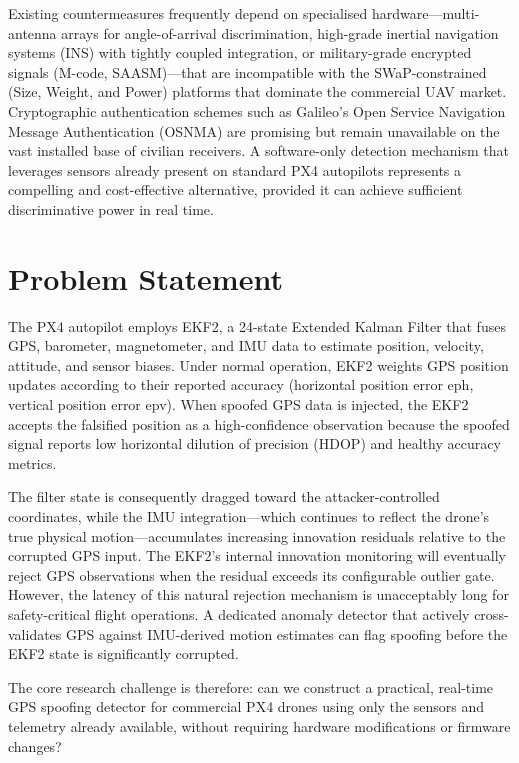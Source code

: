 Existing countermeasures frequently depend on specialised hardware---multi-antenna arrays for angle-of-arrival discrimination, high-grade inertial navigation systems (INS) with tightly coupled integration, or military-grade encrypted signals (M-code, SAASM)---that are incompatible with the SWaP-constrained (Size, Weight, and Power) platforms that dominate the commercial UAV market. Cryptographic authentication schemes such as Galileo's Open Service Navigation Message Authentication (OSNMA) are promising but remain unavailable on the vast installed base of civilian receivers. A software-only detection mechanism that leverages sensors already present on standard PX4 autopilots represents a compelling and cost-effective alternative, provided it can achieve sufficient discriminative power in real time.

\section{Problem Statement}

The PX4 autopilot employs EKF2, a 24-state Extended Kalman Filter that fuses GPS, barometer, magnetometer, and IMU data to estimate position, velocity, attitude, and sensor biases. Under normal operation, EKF2 weights GPS position updates according to their reported accuracy (horizontal position error eph, vertical position error epv). When spoofed GPS data is injected, the EKF2 accepts the falsified position as a high-confidence observation because the spoofed signal reports low horizontal dilution of precision (HDOP) and healthy accuracy metrics.

The filter state is consequently dragged toward the attacker-controlled coordinates, while the IMU integration---which continues to reflect the drone's true physical motion---accumulates increasing innovation residuals relative to the corrupted GPS input. The EKF2's internal innovation monitoring will eventually reject GPS observations when the residual exceeds its configurable outlier gate. However, the latency of this natural rejection mechanism is unacceptably long for safety-critical flight operations. A dedicated anomaly detector that actively cross-validates GPS against IMU-derived motion estimates can flag spoofing before the EKF2 state is significantly corrupted.

The core research challenge is therefore: can we construct a practical, real-time GPS spoofing detector for commercial PX4 drones using only the sensors and telemetry already available, without requiring hardware modifications or firmware changes?

